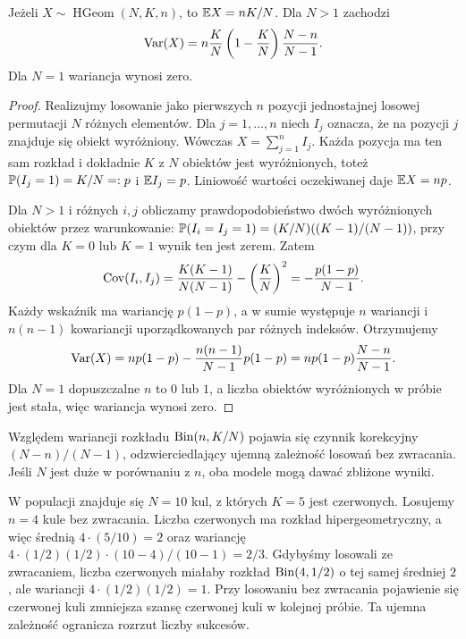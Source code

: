 \begin{twierdzenie}
Jeżeli $X\sim\operatorname{HGeom}(N,K,n)$, to
$\mathbb{E} X=nK/N$. Dla $N>1$ zachodzi
\[
\operatorname{Var}(X)=n\frac KN\left(1-\frac KN\right)\frac{N-n}{N-1}.
\]
Dla $N=1$ wariancja wynosi zero.
\end{twierdzenie}
\begin{proof}
Realizujmy losowanie jako pierwszych $n$ pozycji jednostajnej
losowej permutacji $N$ różnych elementów. Dla
$j=1,\ldots,n$ niech $I_j$ oznacza, że na pozycji $j$
znajduje się obiekt wyróżniony. Wówczas
$X=\sum_{j=1}^n I_j$.
Każda pozycja ma ten sam rozkład i dokładnie $K$
z $N$ obiektów jest wyróżnionych, toteż
$\mathbb{P}(I_j=1)=K/N=:p$ i $\mathbb{E} I_j=p$.
Liniowość wartości oczekiwanej daje $\mathbb{E} X=np$.

Dla $N>1$ i różnych $i,j$ obliczamy prawdopodobieństwo
dwóch wyróżnionych obiektów przez warunkowanie:
$\mathbb{P}(I_i=I_j=1)=(K/N)((K-1)/(N-1))$,
przy czym dla $K=0$ lub $K=1$ wynik ten jest zerem.
Zatem
\[
\operatorname{Cov}(I_i,I_j)=\frac{K(K-1)}{N(N-1)}-
\left(\frac KN\right)^2
=-\frac{p(1-p)}{N-1}.
\]
Każdy wskaźnik ma wariancję $p(1-p)$, a w sumie
występuje $n$ wariancji i $n(n-1)$ kowariancji
uporządkowanych par różnych indeksów. Otrzymujemy
\[
\operatorname{Var}(X)=np(1-p)-\frac{n(n-1)}{N-1}p(1-p)
=np(1-p)\frac{N-n}{N-1}.
\]
Dla $N=1$ dopuszczalne $n$ to $0$ lub $1$,
a liczba obiektów wyróżnionych w próbie jest stała,
więc wariancja wynosi zero.
\end{proof}

\begin{uwaga}
Względem wariancji rozkładu $\operatorname{Bin}(n,K/N)$ pojawia się
czynnik korekcyjny $(N-n)/(N-1)$, odzwierciedlający ujemną
zależność losowań bez zwracania. Jeśli $N$ jest duże w porównaniu
z $n$, oba modele mogą dawać zbliżone wyniki.
\end{uwaga}


\begin{przyklad}
W populacji znajduje się $N=10$ kul, z których $K=5$
jest czerwonych. Losujemy $n=4$ kule bez zwracania.
Liczba czerwonych ma rozkład hipergeometryczny,
a więc średnią $4\cdot(5/10)=2$ oraz wariancję
$4\cdot(1/2)(1/2)\cdot(10-4)/(10-1)=2/3$.
Gdybyśmy losowali ze zwracaniem, liczba czerwonych
miałaby rozkład $\operatorname{Bin}(4,1/2)$ o tej samej średniej $2$,
ale wariancji $4\cdot(1/2)(1/2)=1$.
Przy losowaniu bez zwracania pojawienie się czerwonej kuli
zmniejsza szansę czerwonej kuli w kolejnej próbie.
Ta ujemna zależność ogranicza rozrzut liczby sukcesów.
\end{przyklad}

